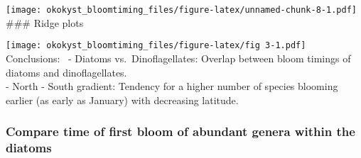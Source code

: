 \documentclass[
]{article}
\newenvironment{Shaded}{\begin{snugshade}}{\end{snugshade}}
\newcommand{\AttributeTok}[1]{\textcolor[rgb]{0.77,0.63,0.00}{#1}}
\newcommand{\DecValTok}[1]{\textcolor[rgb]{0.00,0.00,0.81}{#1}}
\newcommand{\FunctionTok}[1]{\textcolor[rgb]{0.00,0.00,0.00}{#1}}
\newcommand{\NormalTok}[1]{#1}
\newcommand{\OtherTok}[1]{\textcolor[rgb]{0.56,0.35,0.01}{#1}}
\newcommand{\SpecialCharTok}[1]{\textcolor[rgb]{0.00,0.00,0.00}{#1}}
\newcommand{\StringTok}[1]{\textcolor[rgb]{0.31,0.60,0.02}{#1}}
\begin{document}
\texttt{[image: okokyst\_bloomtiming\_files/figure-latex/unnamed-chunk-8-1.pdf]}
\#\#\# Ridge plots

\begin{Shaded}
\end{Shaded}

\texttt{[image: okokyst\_bloomtiming\_files/figure-latex/fig 3-1.pdf]}
Conclusions:~ - Diatoms vs.~Dinoflagellates: Overlap between bloom
timings of diatoms and dinoflagellates.\\
- North - South gradient: Tendency for a higher number of species
blooming earlier (as early as January) with decreasing latitude.

\hypertarget{compare-time-of-first-bloom-of-abundant-genera-within-the-diatoms}{%
\subsubsection{Compare time of first bloom of abundant genera within the
diatoms}\label{compare-time-of-first-bloom-of-abundant-genera-within-the-diatoms}}
\end{document}
